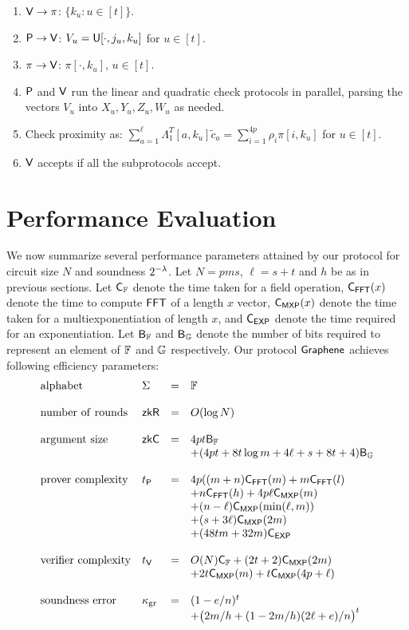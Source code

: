 {\begin{enumerate}[{\rm 1.}]
\item $\mathsf{V}\rightarrow\pi$: $\{k_u:u\in [t]\}$.
\item $\mathsf{P}\rightarrow\mathsf{V}$: $V_u=\mathsf{U}[\cdot,j_u,k_u]$ for $u\in [t]$.
\item $\pi\rightarrow\mathsf{V}$: $\pi[\cdot,k_u]$, $u\in [t]$.
\item $\mathsf{P}$ and $\mathsf{V}$ run the linear and quadratic check protocols in
parallel, parsing the vectors $V_u$ into $X_u,Y_u,Z_u,W_u$ as needed.
\item Check proximity as: $\sum_{a=1}^\ell
\Lambda_1^T[a,k_u]\tilde{c}_a=\sum_{i=1}^{4p}\rho_i\pi[i,k_u]$ for $u\in [t]$.
\item $\mathsf{V}$ accepts if all the subprotocols accept.
\end{enumerate}
}

\section{Performance Evaluation}\label{sec:performancecompare}
We now summarize several performance parameters attained by our protocol for circuit
size $N$ and soundness $2^{-\lambda}$. Let $N=pms$, $\ell=s+t$ and $h$ be as in
previous sections. Let $\mathsf{C}_\mathbb{F}$ denote the time taken for a field operation,
$\mathsf{C}_\mathsf{FFT}(x)$ denote the time to compute $\mathsf{FFT}$ of a length $x$ vector, $\mathsf{C}_\mathsf{MXP}(x)$
denote the time taken for a multiexponentiation of length $x$, and $\mathsf{C}_\mathsf{EXP}$
denote the time required for an exponentiation. Let $\mathsf{B}_\mathbb{F}$ and $\mathsf{B}_\mathbb{G}$ denote
the number of bits required to represent an element of $\mathbb{F}$ and $\mathbb{G}$
respectively. Our protocol $\textsf{Graphene}$ achieves
following efficiency parameters:
{\footnotesize
\begin{align*}
\begin{array}{llrl}
\mathrm{alphabet} & \Sigma & = & \mathbb{F} \\
& & & \\
\mathrm{number\ of\ rounds} & \mathsf{zkR} & = & O(\log{N}) \\
& & & \\
\mathrm{argument\ size} & \mathsf{zkC} & = & 4pt\mathsf{B}_\mathbb{F} \\
& & & +(4pt+8t\log{m}+4\ell+s+8t+4)\mathsf{B}_\mathbb{G} \\
& & & \\
\mathrm{prover\ complexity} & t_{\mathsf{P}} & = &
4p((m+n)\mathsf{C}_\mathsf{FFT}(m)+m\mathsf{C}_\mathsf{FFT}(l) \\
& & &+n\mathsf{C}_\mathsf{FFT}(h) + 4p\ell\mathsf{C}_\mathsf{MXP}(m)\\
& & &+(n-\ell)\mathsf{C}_\mathsf{MXP}(\min(\ell,m))\\
& & & +(s+3\ell)\mathsf{C}_\mathsf{MXP}(2m)\\
& & &+ (48tm+32m)\mathsf{C}_\mathsf{EXP} \\
& & & \\
\mathrm{verifier\ complexity} & t_{\mathsf{V}} & = &
O(N)\mathsf{C}_\mathbb{F} + (2t+2)\mathsf{C}_\mathsf{MXP}(2m)\\
& & & +2t\mathsf{C}_\mathsf{MXP}(m)+t\mathsf{C}_\mathsf{MXP}(4p+\ell) \\
& & & \\
\mathrm{soundness\ error} & \kappa_{\rm gr} & = & (1-e/n)^t \\ 
& & & +\big(2m/h+(1-2m/h)(2\ell+e)/n\big)^t 
\end{array}
\end{align*}
}

